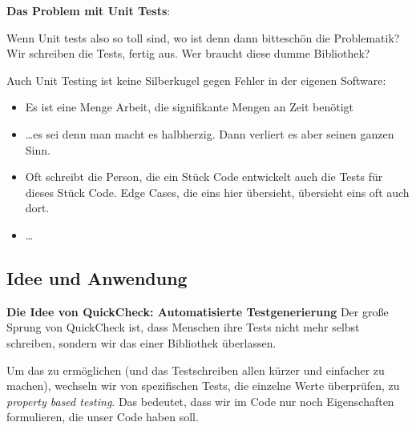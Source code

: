 \documentclass{beamer}
\begin{document}

\begin{frame}
\textbf{Das Problem mit Unit Tests}:
\bigskip

Wenn Unit tests also so toll sind, wo ist denn dann bitteschön die Problematik? Wir schreiben
die Tests, fertig aus. Wer braucht diese dumme Bibliothek?
\pause
\bigskip

Auch Unit Testing ist keine Silberkugel gegen Fehler in der eigenen Software:\pause

\begin{itemize}
\item Es ist eine Menge Arbeit, die signifikante Mengen an Zeit benötigt\pause
\item \dots es sei denn man macht es halbherzig. Dann verliert es aber seinen ganzen Sinn.\pause
\item Oft schreibt die Person, die ein Stück Code entwickelt auch die Tests für dieses Stück Code. Edge Cases, die eins hier übersieht, übersieht eins oft auch dort.\pause
\item \dots
\end{itemize}
\end{frame}

\subsection{Idee und Anwendung}

\begin{frame}
\textbf{Die Idee von QuickCheck: Automatisierte Testgenerierung}
\bigskip
Der große Sprung von QuickCheck ist, dass Menschen ihre Tests nicht mehr selbst schreiben,
sondern wir das einer Bibliothek überlassen. 
\smallskip\smallskip
\pause 

Um das zu ermöglichen (und das Testschreiben allen kürzer und einfacher zu machen), wechseln
wir von spezifischen Tests, die einzelne Werte überprüfen, zu \emph{property based testing}. Das bedeutet, dass wir im Code nur noch Eigenschaften formulieren, die unser Code haben soll.

\end{frame}

\end{document}
